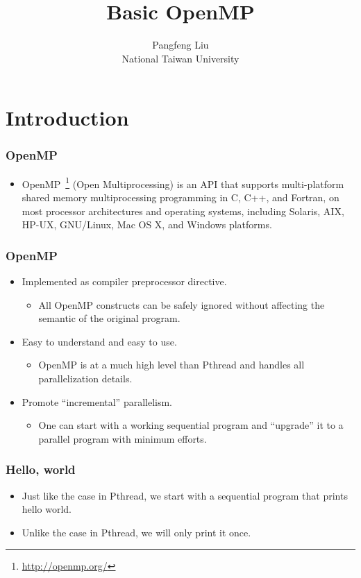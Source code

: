 \documentclass{beamer}
\begin{document}
\title{Basic OpenMP}

\author{Pangfeng Liu \\ National Taiwan University}

\begin{frame}
\titlepage
\end{frame}

\section{Introduction} 

\begin{frame}
\frametitle{OpenMP}
\begin{itemize}
\item OpenMP~\footnote{\url{http://openmp.org/}} (Open
  Multiprocessing) is an API that supports multi-platform shared
  memory multiprocessing programming in C, C++, and Fortran, on most
  processor architectures and operating systems, including Solaris,
  AIX, HP-UX, GNU/Linux, Mac OS X, and Windows platforms.
\end{itemize}
\end{frame}

\begin{frame}
\frametitle{OpenMP} 
\begin{itemize}
\item Implemented as compiler preprocessor directive.
\begin{itemize}
\item All OpenMP constructs can be safely ignored without affecting
  the semantic of the original program.
\end{itemize}
\item Easy to understand and easy to use.
\begin{itemize}
\item OpenMP is at a much high level than Pthread and handles all
  parallelization details.
\end{itemize}
\item Promote ``incremental'' parallelism.
\begin{itemize}
\item One can start with a working sequential program and ``upgrade''
  it to a parallel program with minimum efforts.
\end{itemize}
\end{itemize}
\end{frame}

\begin{frame}
\frametitle{Hello, world}
\begin{itemize}
\item Just like the case in Pthread, we start with a sequential
  program that prints hello world.
\item Unlike the case in Pthread, we will only print it once.
\end{itemize}
\end{frame}
\end{document}
